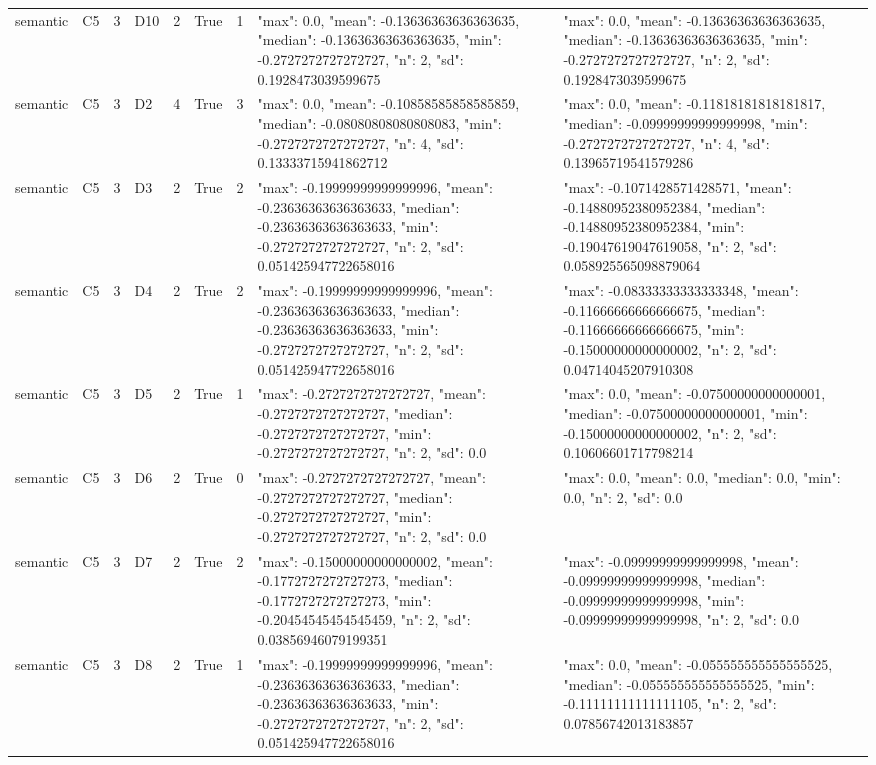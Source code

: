 \begin{tabular}{lllllllll}
semantic & C5 & 3 & D10 & 2 & True & 1 & {"max": 0.0, "mean": -0.13636363636363635, "median": -0.13636363636363635, "min": -0.2727272727272727, "n": 2, "sd": 0.1928473039599675} & {"max": 0.0, "mean": -0.13636363636363635, "median": -0.13636363636363635, "min": -0.2727272727272727, "n": 2, "sd": 0.1928473039599675} \\
semantic & C5 & 3 & D2 & 4 & True & 3 & {"max": 0.0, "mean": -0.10858585858585859, "median": -0.08080808080808083, "min": -0.2727272727272727, "n": 4, "sd": 0.13333715941862712} & {"max": 0.0, "mean": -0.11818181818181817, "median": -0.09999999999999998, "min": -0.2727272727272727, "n": 4, "sd": 0.13965719541579286} \\
semantic & C5 & 3 & D3 & 2 & True & 2 & {"max": -0.19999999999999996, "mean": -0.23636363636363633, "median": -0.23636363636363633, "min": -0.2727272727272727, "n": 2, "sd": 0.051425947722658016} & {"max": -0.1071428571428571, "mean": -0.14880952380952384, "median": -0.14880952380952384, "min": -0.19047619047619058, "n": 2, "sd": 0.058925565098879064} \\
semantic & C5 & 3 & D4 & 2 & True & 2 & {"max": -0.19999999999999996, "mean": -0.23636363636363633, "median": -0.23636363636363633, "min": -0.2727272727272727, "n": 2, "sd": 0.051425947722658016} & {"max": -0.08333333333333348, "mean": -0.11666666666666675, "median": -0.11666666666666675, "min": -0.15000000000000002, "n": 2, "sd": 0.04714045207910308} \\
semantic & C5 & 3 & D5 & 2 & True & 1 & {"max": -0.2727272727272727, "mean": -0.2727272727272727, "median": -0.2727272727272727, "min": -0.2727272727272727, "n": 2, "sd": 0.0} & {"max": 0.0, "mean": -0.07500000000000001, "median": -0.07500000000000001, "min": -0.15000000000000002, "n": 2, "sd": 0.10606601717798214} \\
semantic & C5 & 3 & D6 & 2 & True & 0 & {"max": -0.2727272727272727, "mean": -0.2727272727272727, "median": -0.2727272727272727, "min": -0.2727272727272727, "n": 2, "sd": 0.0} & {"max": 0.0, "mean": 0.0, "median": 0.0, "min": 0.0, "n": 2, "sd": 0.0} \\
semantic & C5 & 3 & D7 & 2 & True & 2 & {"max": -0.15000000000000002, "mean": -0.1772727272727273, "median": -0.1772727272727273, "min": -0.20454545454545459, "n": 2, "sd": 0.03856946079199351} & {"max": -0.09999999999999998, "mean": -0.09999999999999998, "median": -0.09999999999999998, "min": -0.09999999999999998, "n": 2, "sd": 0.0} \\
semantic & C5 & 3 & D8 & 2 & True & 1 & {"max": -0.19999999999999996, "mean": -0.23636363636363633, "median": -0.23636363636363633, "min": -0.2727272727272727, "n": 2, "sd": 0.051425947722658016} & {"max": 0.0, "mean": -0.055555555555555525, "median": -0.055555555555555525, "min": -0.11111111111111105, "n": 2, "sd": 0.07856742013183857} \\

\end{tabular}
